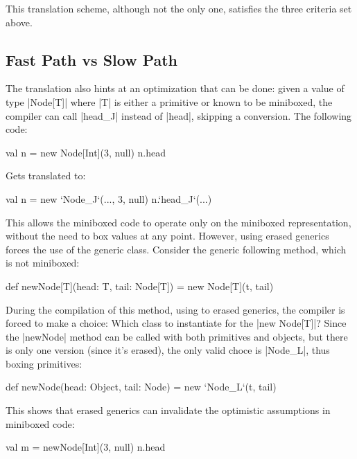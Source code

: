 This translation scheme, although not the only one, satisfies the three criteria set above.

\subsection{Fast Path vs Slow Path}

The translation also hints at an optimization that can be done: given a value of type |Node[T]| where |T| is either a primitive or known to be miniboxed, the compiler can call |head_J| instead of |head|, skipping a conversion. The following code:

\begin{lstlisting-nobreak}
 val n = new Node[Int](3, null)
 n.head
\end{lstlisting-nobreak}

Gets translated to:

\begin{lstlisting-nobreak}
 val n = new `Node_J`(..., 3, null)
 n.`head_J`(...)
\end{lstlisting-nobreak}

This allows the miniboxed code to operate only on the miniboxed representation, without the need to box values at any point. However, using erased generics forces the use of the generic class. Consider the generic following method, which is not miniboxed:

\begin{lstlisting-nobreak}
 def newNode[T](head: T, tail: Node[T]) =
   new Node[T](t, tail)
\end{lstlisting-nobreak}

During the compilation of this method, using to erased generics, the compiler is forced to make a choice: Which class to instantiate for the |new Node[T]|? Since the |newNode| method can be called with both primitives and objects, but there is only one version (since it's erased), the only valid choce is |Node_L|, thus boxing primitives:

\begin{lstlisting-nobreak}
 def newNode(head: Object, tail: Node) =
   new `Node_L`(t, tail)
\end{lstlisting-nobreak}

This shows that erased generics can invalidate the optimistic assumptions in miniboxed code:

\begin{lstlisting-nobreak}
 val m = newNode[Int](3, null)
 n.head
\end{lstlisting-nobreak}

